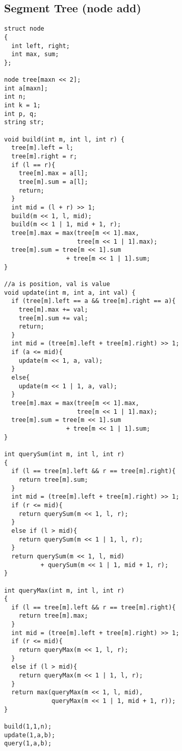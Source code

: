 \documentclass[11pt, a5paper, UTF8]{article}
\begin{document}
\subsection{Segment Tree (node add)}
\begin{lstlisting}
struct node
{
  int left, right;
  int max, sum;
};

node tree[maxn << 2];
int a[maxn];
int n;
int k = 1;
int p, q;
string str;

void build(int m, int l, int r) {
  tree[m].left = l;
  tree[m].right = r;
  if (l == r){
    tree[m].max = a[l];
    tree[m].sum = a[l];
    return;
  }
  int mid = (l + r) >> 1;
  build(m << 1, l, mid);
  build(m << 1 | 1, mid + 1, r);
  tree[m].max = max(tree[m << 1].max, 
                    tree[m << 1 | 1].max);
  tree[m].sum = tree[m << 1].sum 
                 + tree[m << 1 | 1].sum;
}

//a is position, val is value
void update(int m, int a, int val) {
  if (tree[m].left == a && tree[m].right == a){
    tree[m].max += val;
    tree[m].sum += val;
    return;
  }
  int mid = (tree[m].left + tree[m].right) >> 1;
  if (a <= mid){
    update(m << 1, a, val);
  }
  else{
    update(m << 1 | 1, a, val);
  }
  tree[m].max = max(tree[m << 1].max, 
                    tree[m << 1 | 1].max);
  tree[m].sum = tree[m << 1].sum 
                 + tree[m << 1 | 1].sum;
}

int querySum(int m, int l, int r)
{
  if (l == tree[m].left && r == tree[m].right){
    return tree[m].sum;
  }
  int mid = (tree[m].left + tree[m].right) >> 1;
  if (r <= mid){
    return querySum(m << 1, l, r);
  }
  else if (l > mid){
    return querySum(m << 1 | 1, l, r);
  }
  return querySum(m << 1, l, mid) 
          + querySum(m << 1 | 1, mid + 1, r);
}

int queryMax(int m, int l, int r)
{
  if (l == tree[m].left && r == tree[m].right){
    return tree[m].max;
  }
  int mid = (tree[m].left + tree[m].right) >> 1;
  if (r <= mid){
    return queryMax(m << 1, l, r);
  }
  else if (l > mid){
    return queryMax(m << 1 | 1, l, r);
  }
  return max(queryMax(m << 1, l, mid), 
             queryMax(m << 1 | 1, mid + 1, r));
} 

build(1,1,n);  
update(1,a,b);  
query(1,a,b);  
\end{lstlisting}
\ 
\end{document}
